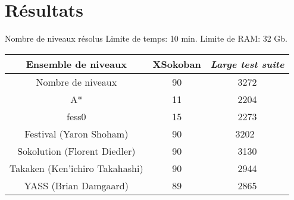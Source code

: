     \section{Résultats}
        \begin{frame}{Nombre de niveaux résolus}
            Limite de temps: 10 min. Limite de RAM: 32 Gb.
            \centering
            \begin{tabular}{|c|c|c|}
                \hline
                Ensemble de niveaux            & XSokoban & \textit{Large test suite} \\
                \hline
                Nombre de niveaux              & 90       & 3272 \\
                \hline
                A*                             & 11       & 2204 \\
                \hline
                fess0                          & 15       & 2273 \\
                \hline
                Festival (Yaron Shoham)        & 90       & 3202 \\
                \hline
                Sokolution (Florent Diedler)   & 90       & 3130 \\
                \hline
                Takaken (Ken'ichiro Takahashi) & 90       & 2944 \\
                \hline
                YASS (Brian Damgaard)          & 89       & 2865 \\
                \hline
            \end{tabular}
        \end{frame}
